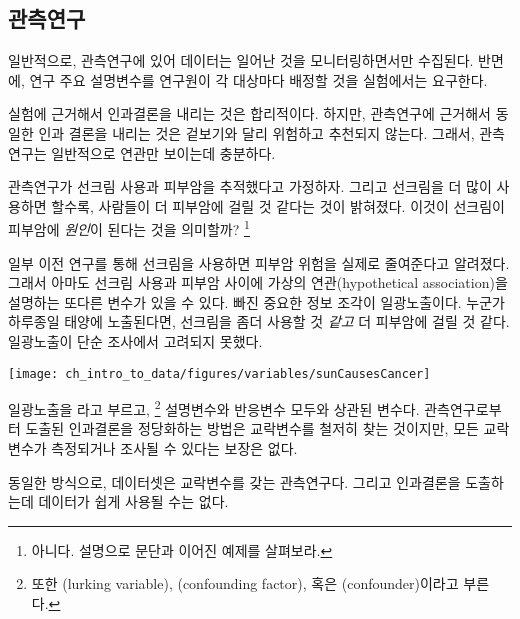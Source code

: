 \subsection{관측연구}

일반적으로, 관측연구에 있어 데이터는 일어난 것을 모니터링하면서만 수집된다.
반면에, 연구 주요 설명변수를 연구원이 각 대상마다 배정할 것을 실험에서는 요구한다.

실험에 근거해서 인과결론을 내리는 것은 합리적이다. 하지만,
관측연구에 근거해서 동일한 인과 결론을 내리는 것은 겉보기와 달리 위험하고 추천되지 않는다.
그래서, 관측연구는 일반적으로 연관만 보이는데 충분하다.


\begin{exercise} \label{sunscreenLurkingExample}
관측연구가 선크림 사용과 피부암을 추적했다고 가정하자. 그리고 선크림을 더 많이 사용하면 할수록,
사람들이 더 피부암에 걸릴 것 같다는 것이 밝혀졌다. 이것이 선크림이 피부암에 \emph{원인}이 된다는 것을 의미할까?
\footnote{아니다. 설명으로 문단과 이어진 예제를 살펴보라.}
\end{exercise}

일부 이전 연구를 통해 선크림을 사용하면 피부암 위험을 실제로 줄여준다고 알려졌다.
그래서 아마도 선크림 사용과 피부암 사이에 가상의 연관(hypothetical association)을 설명하는 또다른 변수가 있을 수 있다.
빠진 중요한 정보 조각이 일광노출이다.
누군가 하루종일 태양에 노출된다면, 선크림을 좀더 사용할 것 \emph{같고} 더 피부암에 걸릴 것 같다.
일광노출이 단순 조사에서 고려되지 못했다.

\begin{center}
\texttt{[image: ch\_intro\_to\_data/figures/variables/sunCausesCancer]}
\end{center}

일광노출을 라고 부르고, \footnote{또한 (lurking variable), (confounding factor), 혹은 (confounder)이라고 부른다.} 설명변수와 반응변수 모두와 상관된 변수다.
관측연구로부터 도출된 인과결론을 정당화하는 방법은 교락변수를 철저히 찾는 것이지만, 
모든 교락변수가 측정되거나 조사될 수 있다는 보장은 없다.

동일한 방식으로,  데이터셋은 교락변수를 갖는 관측연구다. 그리고 인과결론을 도출하는데 데이터가 쉽게 사용될 수는 없다.

